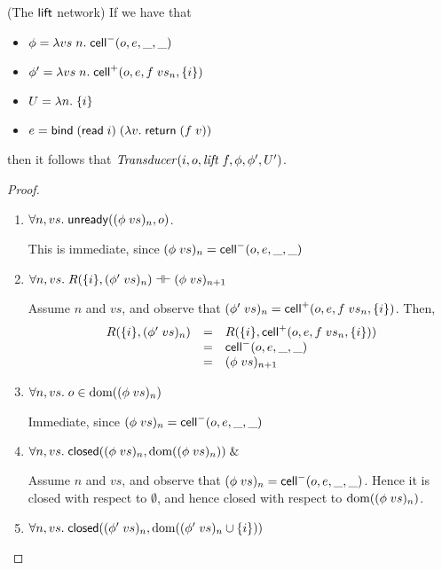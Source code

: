 \begin{lemma}{(The $\mathsf{lift}$ network)}
If we have that 
\begin{itemize}
\item $\phi = \lambda vs\;n.\;\mathsf{cell}^{-}({o}, {e}, {\_}, {\_})$ 
\item $\phi' = \lambda vs\;n.\;\mathsf{cell}^{+}({o}, {e}, {f\;vs_n}, {\{{i}\}})$ 
\item $U = \lambda n.\;\{{i}\}$
\item $e = \mathsf{bind}\; (\mathsf{read}\; i)\; (\lambda v.\;\mathsf{return}\; (f\;v))$
\end{itemize}
then it follows that $\mathit{Transducer}(i, o, \mathit{lift}\;f, \phi, \phi', U')$. 
\end{lemma}
\begin{proof}
\begin{enumerate}
\item $\forall n, vs.\; \mathsf{unready}({(\phi\;vs)_n}, {o})$.

  This is immediate, since $(\phi\;vs)_n = \mathsf{cell}^{-}({o}, {e}, {\_}, {\_})$ 

\item $\forall n, vs.\; R(\{{i}\}, (\phi'\;vs)_n) \dashv\vdash (\phi\;vs)_{n+1}$
  
  Assume $n$ and $vs$, and observe that $(\phi'\;vs)_n = \mathsf{cell}^{+}({o}, {e}, {f\;vs_n}, {\{{i}\}})$. Then,
  \begin{displaymath}
  \begin{array}{lcl}
    R(\{{i}\}, (\phi'\;vs)_n) & = & R(\{{i}\}, \mathsf{cell}^{+}({o}, {e}, {f\;vs_n}, {\{{i}\}})) \\
                                & = & \mathsf{cell}^{-}({o}, {e}, {\_}, {\_}) \\
                                & = & (\phi\;vs)_{n+1}
  \end{array}
  \end{displaymath}

\item $\forall n, vs.\; o \in \mbox{dom}({(\phi\;vs)_n})$

  Immediate, since $(\phi\;vs)_n = \mathsf{cell}^{-}({o}, {e}, {\_}, {\_})$

\item $\forall n, vs.\; \mathsf{closed}({(\phi\;vs)_n}, {\mbox{dom}({(\phi\;vs)_n})}) \;\&\;$ 

  Assume $n$ and $vs$, and observe that $(\phi\;vs)_n = \mathsf{cell}^{-}({o}, {e}, {\_}, {\_})$. Hence it 
  is closed with respect to $\emptyset$, and hence closed with respect to $\mbox{dom}({(\phi\;vs)_n})$. 

\item $\forall n, vs.\; \mathsf{closed}({(\phi'\;vs)_n}, {\mbox{dom}({(\phi'\;vs)_n \cup \{{i}\}})})$ 


\end{enumerate}
\end{proof}
